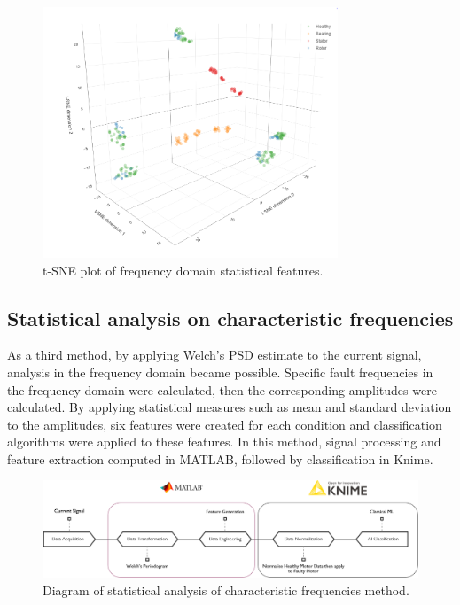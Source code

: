 \begin{figure}[h]
	\centering
	\includegraphics[width=250pt,keepaspectratio=true]{./fig/sne_psd.PNG}
	\caption{t-SNE plot of frequency domain statistical features.}	
	\label{snep}
\end{figure}
\pagebreak
\subsection{Statistical analysis on characteristic frequencies}

As a third method, by applying Welch's PSD estimate to the current signal, analysis in the frequency domain became possible. Specific fault frequencies in the frequency domain were calculated, then the corresponding amplitudes were calculated. By applying statistical measures such as mean and standard deviation to the amplitudes, six features were created for each condition and classification algorithms were applied to these features. In this method, signal processing and feature extraction computed in MATLAB, followed by classification in Knime.

\begin{figure}[h]
	\centering
	\includegraphics[width=400pt,keepaspectratio=true]{./fig/method3.PNG}
	\caption{Diagram of statistical analysis of characteristic frequencies method.}	
	\label{method3}
\end{figure}

